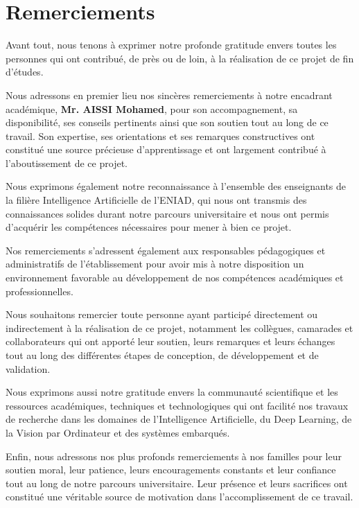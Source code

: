 \chapter*{Remerciements}

Avant tout, nous tenons à exprimer notre profonde gratitude envers toutes les personnes qui ont contribué, de près ou de loin, à la réalisation de ce projet de fin d'études.

Nous adressons en premier lieu nos sincères remerciements à notre encadrant académique, \textbf{Mr. AISSI Mohamed}, pour son accompagnement, sa disponibilité, ses conseils pertinents ainsi que son soutien tout au long de ce travail. Son expertise, ses orientations et ses remarques constructives ont constitué une source précieuse d'apprentissage et ont largement contribué à l'aboutissement de ce projet.

Nous exprimons également notre reconnaissance à l'ensemble des enseignants de la filière Intelligence Artificielle de l'ENIAD, qui nous ont transmis des connaissances solides durant notre parcours universitaire et nous ont permis d'acquérir les compétences nécessaires pour mener à bien ce projet.

Nos remerciements s'adressent également aux responsables pédagogiques et administratifs de l'établissement pour avoir mis à notre disposition un environnement favorable au développement de nos compétences académiques et professionnelles.

Nous souhaitons remercier toute personne ayant participé directement ou indirectement à la réalisation de ce projet, notamment les collègues, camarades et collaborateurs qui ont apporté leur soutien, leurs remarques et leurs échanges tout au long des différentes étapes de conception, de développement et de validation.

Nous exprimons aussi notre gratitude envers la communauté scientifique et les ressources académiques, techniques et technologiques qui ont facilité nos travaux de recherche dans les domaines de l'Intelligence Artificielle, du Deep Learning, de la Vision par Ordinateur et des systèmes embarqués.

Enfin, nous adressons nos plus profonds remerciements à nos familles pour leur soutien moral, leur patience, leurs encouragements constants et leur confiance tout au long de notre parcours universitaire. Leur présence et leurs sacrifices ont constitué une véritable source de motivation dans l'accomplissement de ce travail.

